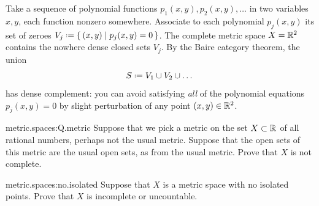 \begin{example}
Take a sequence of polynomial functions \(p_1(x,y), p_2(x,y), \dots\) in two variables \(x,y\), each function nonzero somewhere.
Associate to each polynomial \(p_j(x,y)\) its set of zeroes \(V_j\defeq\set{(x,y)|p_j(x,y)=0}\).
The complete metric space \(X=\mathbb{R}^{2}\) contains the nowhere dense closed sets \(V_j\).
By the Baire category theorem, the union
\[
S \defeq V_1 \cup V_2 \cup \dots
\]
has dense complement: you can avoid satisfying \emph{all} of the polynomial equations \(p_j(x,y)=0\) by slight perturbation of any point \((x,y) \in \mathbb{R}^{2}\).
\end{example}
\begin{problem}{metric.spaces:Q.metric}
Suppose that we pick a metric on the set \(X \subset \mathbb{R}^{}\) of all rational numbers, perhaps not the usual metric.
Suppose that the open sets of this metric are the usual open sets, as from the usual metric.
Prove that \(X\) is not complete.
\end{problem}
\begin{problem}{metric.spaces:no.isolated}
Suppose that \(X\) is a metric space with no isolated points.
Prove that \(X\) is incomplete or uncountable.
\end{problem}
